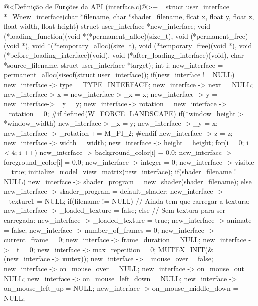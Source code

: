 \iniciocodigo
@<Definição de Funções da API (interface.c)@>+=
struct user_interface *_Wnew_interface(char *filename, char *shader_filename,
                                  float x, float y, float z, float width,
                                  float height){
  struct user_interface *new_interface;
  void (*loading_function)(void *(*permanent_alloc)(size_t),
                           void (*permanent_free)(void *),
                           void *(*temporary_alloc)(size_t),
                           void (*temporary_free)(void *),
                           void (*before_loading_interface)(void),
                           void (*after_loading_interface)(void),
                           char *source_filename, struct user_interface *target);
  int i;
  new_interface = permanent_alloc(sizeof(struct user_interface));
  if(new_interface != NULL){
    new_interface -> type = TYPE_INTERFACE;
    new_interface -> next = NULL;
    new_interface-> x = new_interface-> _x = x;
    new_interface -> y = new_interface-> _y = y;
    new_interface -> rotation = new_interface -> _rotation = 0;
#if defined(W_FORCE_LANDSCAPE)
   if(*window_height > *window_width){
      new_interface-> _x = y;
      new_interface -> _y = x;
      new_interface -> _rotation += M_PI_2;
   }
#endif
    new_interface -> z = z;
    new_interface -> width = width;
    new_interface -> height = height;
    for(i = 0; i < 4; i ++){
      new_interface -> background_color[i] = 0.0;
      new_interface -> foreground_color[i] = 0.0;
    }
    new_interface -> integer = 0;
    new_interface -> visible = true;
    initialize_model_view_matrix(new_interface);
    if(shader_filename != NULL)
      new_interface -> shader_program = new_shader(shader_filename);
    else
      new_interface -> shader_program = default_shader;
    new_interface -> _texture1 = NULL;
    if(filename != NULL) // Ainda tem que carregar a textura:
      new_interface -> _loaded_texture = false;
    else // Sem textura para ser carregada:
      new_interface -> _loaded_texture = true;
    new_interface -> animate = false;
    new_interface -> number_of_frames = 0;
    new_interface -> current_frame = 0;
    new_interface -> frame_duration = NULL;
    new_interface -> _t = 0;
    new_interface -> max_repetition = 0;
    MUTEX_INIT(&(new_interface -> mutex));
    new_interface -> _mouse_over = false;
    new_interface -> on_mouse_over = NULL;
    new_interface -> on_mouse_out = NULL;
    new_interface -> on_mouse_left_down = NULL;
    new_interface -> on_mouse_left_up = NULL;
    new_interface -> on_mouse_middle_down = NULL;
}}

